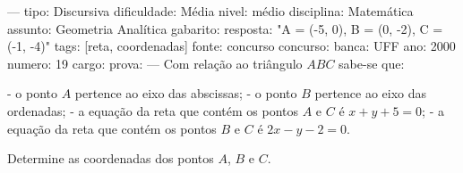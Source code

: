 ---
tipo: Discursiva
dificuldade: Média
nivel: médio
disciplina: Matemática
assunto: Geometria Analítica
gabarito:
resposta: "A = (-5, 0), B = (0, -2), C = (-1, -4)"
tags: [reta, coordenadas]
fonte: concurso
concurso:
banca: UFF
ano: 2000
numero: 19
cargo:
prova:
---
\question
Com relação ao triângulo $ABC$ sabe-se que:

- o ponto $A$ pertence ao eixo das abscissas;
- o ponto $B$ pertence ao eixo das ordenadas;
- a equação da reta que contém os pontos $A$ e $C$ é $x + y + 5 = 0$;
- a equação da reta que contém os pontos $B$ e $C$ é $2x - y - 2 = 0$.

Determine as coordenadas dos pontos $A$, $B$ e $C$.
